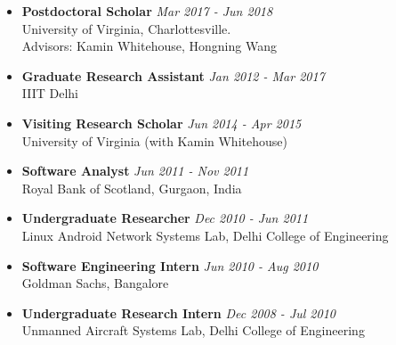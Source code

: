 \documentclass[letter,10pt]{article}
\begin{document}
\begin{itemize}

 \item[] \textbf{Postdoctoral Scholar} \hfill \textit{Mar 2017 - Jun 2018}\\
	University of Virginia, Charlottesville. \\
    Advisors: Kamin Whitehouse, Hongning Wang

    \item[] \textbf{Graduate Research Assistant}
     \hfill \textit{Jan 2012 - Mar 2017}\\
	IIIT Delhi
	\item[] \textbf{Visiting Research Scholar}
	\hfill \textit{Jun 2014 - Apr 2015} \\ 
	University of Virginia (with Kamin Whitehouse)
	\item[] \textbf{Software Analyst}
	\hfill \textit{Jun 2011 - Nov 2011} \\ 
	Royal Bank of Scotland, Gurgaon, India
	\item[] \textbf{Undergraduate Researcher}
	\hfill \textit{Dec 2010 - Jun 2011} \\ 
	Linux Android Network Systems Lab, Delhi College of Engineering
	\item[] \textbf{Software Engineering Intern}
	\hfill \textit{Jun 2010 - Aug 2010}\\
	Goldman Sachs, Bangalore
	\item[] \textbf{Undergraduate Research Intern}
	\hfill \textit{Dec 2008 - Jul 2010}\\
	Unmanned Aircraft Systems Lab, Delhi College of Engineering
	
	

\end{itemize}
\end{document}
